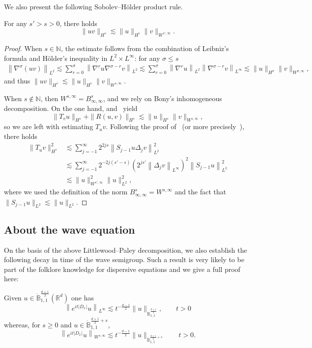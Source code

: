 \documentclass[AHL,Unicode,longabstracts,published]{cedram}
\newcommand{\R}{\mathbb{R}}
\newcommand{\N}{\mathbb{N}}
\newcommand{\bbB}{\mathbb{B}}
\renewcommand*\le{\leqslant}
\renewcommand*\geq{\geqslant}
\begin{document}
We also present the following Sobolev--H\"older product rule.
\begin{prop}\label{prop:product_sobolev_holder}
For any $s' > s > 0$, there holds
\[
\| u v \|_{H^s} \lesssim \| u \|_{H^s} \| v \|_{W^{s', \infty}}.
\]
\end{prop}
\begin{proof}
When $s \in \N$, the estimate follows from the combination of Leibniz's formula and H\"older's inequality in $L^2 \times L^\infty$: for any $\sigma \le s$
\begin{align*}
\left\| \nabla^\sigma (u v) \right\|_{L^2} \lesssim \sum_{r = 0}^\sigma \left\| \nabla^r u \nabla^{\sigma - r} v \right\|_{L^2}
\lesssim \sum_{r = 0}^\sigma \left\| \nabla^r u \right\|_{L^2} \left\| \nabla^{\sigma - r} v \right\|_{L^\infty} \lesssim \| u \|_{H^\sigma} \| v \|_{W^{\sigma, \infty}},
\end{align*}
and thus $\| uv \|_{H^s} \lesssim \| u \|_{H^s} \| v \|_{W^{s, \infty}}$.

When $s \notin \N$, then $W^{s, \infty} = B^{s}_{\infty, \infty}$, and we rely on Bony's inhomogeneous decomposition. On the one hand, \cite[Theorem~2.82]{BCD2011} and~\cite[Theorem~2.85]{BCD2011} yield
\[
\| T_v u \|_{H^s} + \| R(u, v) \|_{H^s} \lesssim \| u \|_{H^s} \| v \|_{W^{s, \infty}},
\]
so we are left with estimating $T_u v$. Following the proof of~\cite[Theorem~2.82]{BCD2011} (or more precisely~\cite[Theorem~2.82]{BCD2011}), there holds
\begin{equation*}
\begin{split}
\| T_u v \|_{H^s}^2 & \lesssim \sum_{j = -1}^\infty 2^{2 j s} \left\| S_{j-1} u \Delta_j v \right\|_{L^2}^2 \\
& \lesssim \sum_{j = -1}^\infty 2^{-2 j (s'-s)} \left(2^{ j s'} \left\| \Delta_j v \right\|_{L^\infty} \right)^2 \left\| S_{j-1} u \right\|_{L^2}^2 \\
& \lesssim \| u \|_{W^{s', \infty}}^2 \| u \|_{L^2}^2,
\end{split}
\end{equation*}
where we used the definition of the norm $B^{s}_{\infty, \infty}=W^{s, \infty}$ and the fact that $\| S_{j-1} u \|_{L^2} \lesssim \| u \|_{L^2}$.
\end{proof}

\subsection{About the wave equation} 

On the basis of the above Littlewood--Paley decomposition, we also establish the following decay in time of the wave semigroup. Such a result is very likely to be part of the folklore knowledge for dispersive equations and we give a full proof here:
\begin{lemm}\label{lem:wave-equation}
Given $u \in \dot{\bbB}_{1,1}^{\frac{d+1}{2}}(\R^d)$ one has
\[
\left\|e^{it|D_x|}u\right\|_{L^\infty} \lesssim t^{-\frac{d-1}{2}}\|u\|_{\dot{\bbB}_{1,1}^{\frac{d+1}{2}}}, \qquad t >0
\]
whereas, for $s \geq 0$ and $u \in \dot{\bbB}_{1,1}^{\frac{d+1}{2}+s}$,
\[
\left\|e^{it|D_x|}u\right\|_{W^{s,\infty}}\lesssim t^{-\frac{d-1}{2}}\|u\|_{\dot{\bbB}^{\frac{d+1}{2}+s}_{1,1}} \qquad t >0.
\]
\end{lemm}
\end{document}
